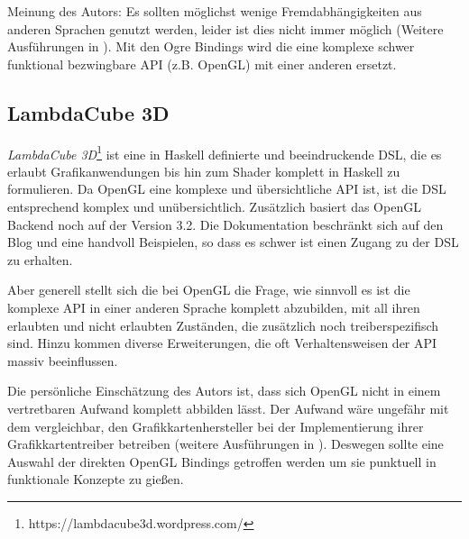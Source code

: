 Meinung des Autors: Es sollten möglichst wenige Fremdabhängigkeiten aus anderen Sprachen genutzt werden, leider ist dies nicht immer möglich (Weitere Ausführungen in ). Mit den Ogre Bindings wird die eine komplexe schwer funktional bezwingbare \acs{API} (z.B. OpenGL) mit einer anderen ersetzt.

\subsection{LambdaCube 3D}

\textit{LambdaCube 3D}\footnote{https://lambdacube3d.wordpress.com/} ist eine in Haskell definierte und beeindruckende \ac{DSL}, die es erlaubt Grafikanwendungen bis hin zum Shader komplett in Haskell zu formulieren. Da OpenGL eine komplexe und übersichtliche \acs{API} ist, ist die \ac{DSL} entsprechend komplex und unübersichtlich. Zusätzlich basiert das OpenGL Backend noch auf der Version 3.2. Die Dokumentation beschränkt sich auf den Blog und eine handvoll Beispielen, so dass es schwer ist einen Zugang zu der DSL zu erhalten.

Aber generell stellt sich die bei OpenGL die Frage, wie sinnvoll es ist die komplexe \acs{API} in einer anderen Sprache komplett abzubilden, mit all ihren erlaubten und nicht erlaubten Zuständen, die zusätzlich noch treiberspezifisch sind. Hinzu kommen diverse Erweiterungen, die oft Verhaltensweisen der \acs{API} massiv beeinflussen.

Die persönliche Einschätzung des Autors ist, dass sich OpenGL nicht in einem vertretbaren Aufwand komplett abbilden lässt. Der Aufwand wäre ungefähr mit dem vergleichbar, den Grafikkartenhersteller bei der Implementierung ihrer Grafikkartentreiber betreiben (weitere Ausführungen in ). Deswegen sollte eine Auswahl der direkten OpenGL Bindings getroffen werden um sie punktuell in funktionale Konzepte zu gießen.


